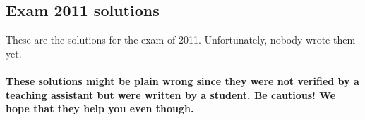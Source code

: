 \documentclass[main]{subfiles}
\begin{document}

\subsection{Exam 2011 solutions}
These are the solutions for the exam of 2011. Unfortunately, nobody wrote them yet.
\\\\
\textbf{These solutions might be plain wrong since they were not verified by a teaching assistant but were written by a student. Be cautious! We hope that they help you even though.}

\end{document}
